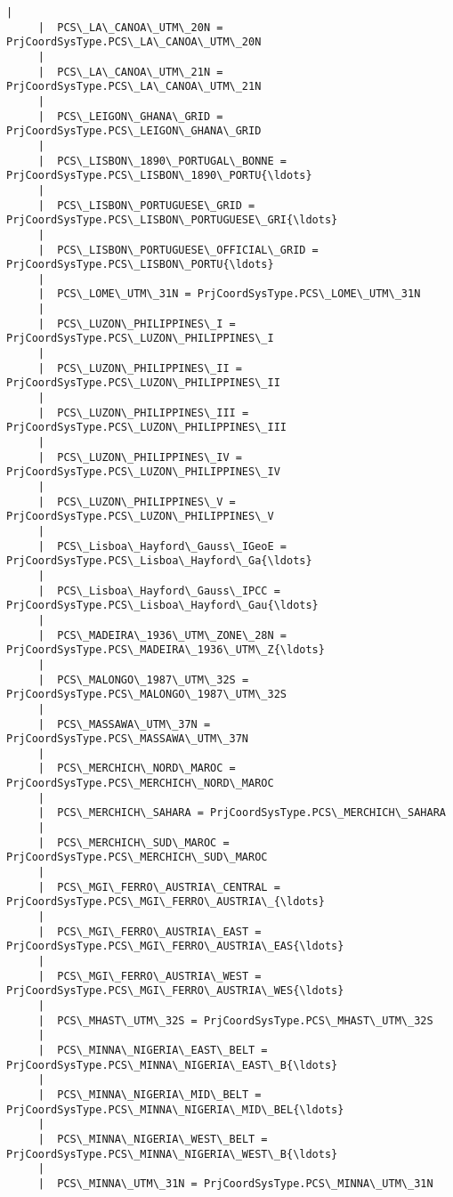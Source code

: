 \documentclass[11pt]{article}
\begin{document}
\begin{Verbatim}[commandchars=\\\{\}]
     |  
     |  PCS\_LA\_CANOA\_UTM\_20N = PrjCoordSysType.PCS\_LA\_CANOA\_UTM\_20N
     |  
     |  PCS\_LA\_CANOA\_UTM\_21N = PrjCoordSysType.PCS\_LA\_CANOA\_UTM\_21N
     |  
     |  PCS\_LEIGON\_GHANA\_GRID = PrjCoordSysType.PCS\_LEIGON\_GHANA\_GRID
     |  
     |  PCS\_LISBON\_1890\_PORTUGAL\_BONNE = PrjCoordSysType.PCS\_LISBON\_1890\_PORTU{\ldots}
     |  
     |  PCS\_LISBON\_PORTUGUESE\_GRID = PrjCoordSysType.PCS\_LISBON\_PORTUGUESE\_GRI{\ldots}
     |  
     |  PCS\_LISBON\_PORTUGUESE\_OFFICIAL\_GRID = PrjCoordSysType.PCS\_LISBON\_PORTU{\ldots}
     |  
     |  PCS\_LOME\_UTM\_31N = PrjCoordSysType.PCS\_LOME\_UTM\_31N
     |  
     |  PCS\_LUZON\_PHILIPPINES\_I = PrjCoordSysType.PCS\_LUZON\_PHILIPPINES\_I
     |  
     |  PCS\_LUZON\_PHILIPPINES\_II = PrjCoordSysType.PCS\_LUZON\_PHILIPPINES\_II
     |  
     |  PCS\_LUZON\_PHILIPPINES\_III = PrjCoordSysType.PCS\_LUZON\_PHILIPPINES\_III
     |  
     |  PCS\_LUZON\_PHILIPPINES\_IV = PrjCoordSysType.PCS\_LUZON\_PHILIPPINES\_IV
     |  
     |  PCS\_LUZON\_PHILIPPINES\_V = PrjCoordSysType.PCS\_LUZON\_PHILIPPINES\_V
     |  
     |  PCS\_Lisboa\_Hayford\_Gauss\_IGeoE = PrjCoordSysType.PCS\_Lisboa\_Hayford\_Ga{\ldots}
     |  
     |  PCS\_Lisboa\_Hayford\_Gauss\_IPCC = PrjCoordSysType.PCS\_Lisboa\_Hayford\_Gau{\ldots}
     |  
     |  PCS\_MADEIRA\_1936\_UTM\_ZONE\_28N = PrjCoordSysType.PCS\_MADEIRA\_1936\_UTM\_Z{\ldots}
     |  
     |  PCS\_MALONGO\_1987\_UTM\_32S = PrjCoordSysType.PCS\_MALONGO\_1987\_UTM\_32S
     |  
     |  PCS\_MASSAWA\_UTM\_37N = PrjCoordSysType.PCS\_MASSAWA\_UTM\_37N
     |  
     |  PCS\_MERCHICH\_NORD\_MAROC = PrjCoordSysType.PCS\_MERCHICH\_NORD\_MAROC
     |  
     |  PCS\_MERCHICH\_SAHARA = PrjCoordSysType.PCS\_MERCHICH\_SAHARA
     |  
     |  PCS\_MERCHICH\_SUD\_MAROC = PrjCoordSysType.PCS\_MERCHICH\_SUD\_MAROC
     |  
     |  PCS\_MGI\_FERRO\_AUSTRIA\_CENTRAL = PrjCoordSysType.PCS\_MGI\_FERRO\_AUSTRIA\_{\ldots}
     |  
     |  PCS\_MGI\_FERRO\_AUSTRIA\_EAST = PrjCoordSysType.PCS\_MGI\_FERRO\_AUSTRIA\_EAS{\ldots}
     |  
     |  PCS\_MGI\_FERRO\_AUSTRIA\_WEST = PrjCoordSysType.PCS\_MGI\_FERRO\_AUSTRIA\_WES{\ldots}
     |  
     |  PCS\_MHAST\_UTM\_32S = PrjCoordSysType.PCS\_MHAST\_UTM\_32S
     |  
     |  PCS\_MINNA\_NIGERIA\_EAST\_BELT = PrjCoordSysType.PCS\_MINNA\_NIGERIA\_EAST\_B{\ldots}
     |  
     |  PCS\_MINNA\_NIGERIA\_MID\_BELT = PrjCoordSysType.PCS\_MINNA\_NIGERIA\_MID\_BEL{\ldots}
     |  
     |  PCS\_MINNA\_NIGERIA\_WEST\_BELT = PrjCoordSysType.PCS\_MINNA\_NIGERIA\_WEST\_B{\ldots}
     |  
     |  PCS\_MINNA\_UTM\_31N = PrjCoordSysType.PCS\_MINNA\_UTM\_31N

\end{Verbatim}
\end{document}
